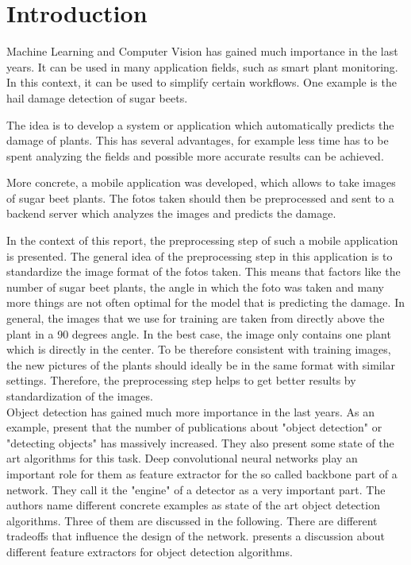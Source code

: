 
\chapter{Introduction}

Machine Learning and Computer Vision has gained much importance in the last years. It can be used in many application fields, such as smart plant monitoring. In this context, it can be used to simplify certain workflows. One example is the hail damage detection of sugar beets. 

The idea is to develop a system or application which automatically predicts the damage of plants. This has several advantages, for example less time has to be spent analyzing the fields and possible more accurate results can be achieved. 

More concrete, a mobile application was developed, which allows to take images of sugar beet plants. The fotos taken should then be preprocessed and sent to a backend server which analyzes the images and predicts the damage. 

In the context of this report, the preprocessing step of such a mobile application is presented. The general idea of the preprocessing step in this application is to standardize the image format of the fotos taken. This means that factors like the number of sugar beet plants, the angle in which the foto was taken and many more things are not often optimal for the model that is predicting the damage. In general, the images that we use for training are taken from directly above the plant in a 90 degrees angle. In the best case, the image only contains one plant which is directly in the center. To be therefore consistent with training images, the new pictures of the plants should ideally be in the same format with similar settings. Therefore, the preprocessing step helps to get better results by standardization of the images. \\

Object detection has gained much more importance in the last years. As an example, \cite{object_detection_history} present that the number of publications about "object detection" or "detecting objects" has massively increased. They also present some state of the art algorithms for this task. Deep convolutional neural networks play an important role for them as feature extractor for the so called backbone part of a network. They call it the "engine" of a detector as a very important part. The authors name different concrete examples as state of the art object detection algorithms. Three of them are discussed in the following. There are different tradeoffs that influence the design of the network. \cite{discussion_engines} presents a discussion about different feature extractors for object detection algorithms.

